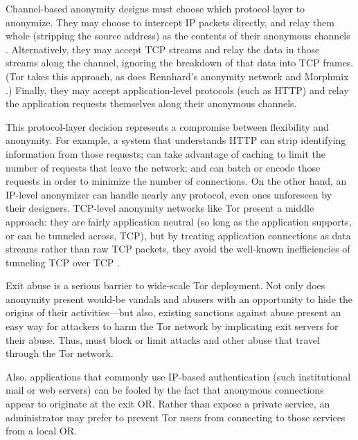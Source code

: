 \documentclass[times,10pt,twocolumn]{article}
\begin{document}

Channel-based anonymity designs must choose which protocol layer to
anonymize.  They may choose to intercept IP packets directly, and relay
them whole (stripping the source address) as the contents of their
anonymous channels \cite{tarzan:ccs02,freedom2-arch}.  Alternatively,
they may
accept TCP streams and relay the data in those streams along the
channel, ignoring the breakdown of that data into TCP frames. (Tor
takes this approach, as does Rennhard's anonymity network \cite{anonnet}
and Morphmix \cite{morphmix:fc04}.)  Finally, they may accept
application-level protocols (such as HTTP) and relay the application
requests themselves along their anonymous channels.

This protocol-layer decision represents a compromise between flexibility
and anonymity.  For example, a system that understands HTTP can strip
identifying information from those requests; can take advantage of
caching to limit the number of requests that leave the network; and can
batch or encode those requests in order to minimize the number of
connections.  On the other hand, an IP-level anonymizer can handle
nearly any protocol, even ones unforeseen by their designers.  TCP-level
anonymity networks like Tor present a middle approach: they are fairly
application neutral (so long as the application supports, or can be
tunneled across, TCP), but by treating application connections as data
streams rather than raw TCP packets, they avoid the well-known
inefficiencies of tunneling TCP over TCP \cite{tcp-over-tcp-is-bad}.



\label{subsec:exitpolicies}

Exit abuse is a serious barrier to wide-scale Tor deployment.  Not
only does anonymity present would-be vandals and abusers with an
opportunity to hide the origins of their activities---but also,
existing sanctions against abuse present an easy way for attackers to
harm the Tor network by implicating exit servers for their abuse.
Thus, must block or limit attacks and other abuse that travel through
the Tor network.

Also, applications that commonly use IP-based authentication (such
institutional mail or web servers) can be fooled by the fact that
anonymous connections appear to originate at the exit OR.  Rather than
expose a private service, an administrator may prefer to prevent Tor
users from connecting to those services from a local OR.
\end{document}
